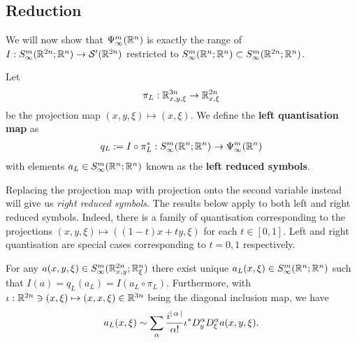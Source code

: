 \documentclass[12pt]{article}
\begin{document}
\subsection{Reduction}
We will now show that $\Psi^{m}_\infty({\mathbb R}^n)$ is exactly the range of $I : S^{m}_\infty({\mathbb R}^{2n}; {\mathbb R}^n) \to \mathcal{S}'({\mathbb R}^{2n})$ restricted to $S^{m}_\infty({\mathbb R}^{n}; {\mathbb R}^n) \subset S^{m}_\infty({\mathbb R}^{2n}; {\mathbb R}^n)$. 
\begin{fdefinition}
    Let 
    \begin{align*}
        \pi_L : {\mathbb R}^{3n}_{x, y, \xi} \to {\ensuremath {\mathbb R}}^{2n}_{x, \xi}
    \end{align*}
    be the projection map $(x, y, \xi) \mapsto (x, \xi)$. We define the \textbf{left quantisation map} as 
    \begin{align*}
        q_L := I \circ \pi_L^* : S^{m}_\infty({\mathbb R}^{n}; {\mathbb R}^n) \to \Psi^{m}_\infty({\mathbb R}^{n}) 
    \end{align*}
    with elements $a_L \in S^{m}_\infty({\mathbb R}^{n}; {\mathbb R}^n)$ known as the \textbf{left reduced symbols}.\\
   
\end{fdefinition}
\begin{rem}
        Replacing the projection map with projection onto the second variable instead will give us \textit{right reduced symbols}. The results below apply to both left and right reduced symbols. Indeed, there is a family of quantisation corresponding to the projections $(x, y, \xi) \mapsto ((1 - t)x + ty, \xi)$ for each $t \in [0, 1]$. Left and right quantisation are special cases corresponding to $t = 0, 1$ respectively. 
\end{rem}
\begin{flemma}[Reduction] 
    For any $a(x, y, \xi) \in S^{m}_\infty({\mathbb R}^{2n}_{x, y}; {\mathbb R}^n_\xi)$ there exist unique $a_L(x, \xi) \in S^{m}_\infty({\mathbb R}^{n}; {\mathbb R}^n)$ such that $I(a) = q_L(a_L) = I(a_L \circ \pi_L)$. Furthermore, with $\iota : {\mathbb R}^{2n} \ni (x, \xi) \mapsto (x, x, \xi) \in {\ensuremath {\mathbb R}}^{3n}$ being the diagonal inclusion map, we have 
    \begin{align}
        a_L(x, \xi) \sim \sum_{\alpha} \frac{i^{\left|\, \alpha\,\right|}}{\alpha !} \iota^* D^\alpha_y D^\alpha_\xi a(x, y, \xi). 
    \end{align}
\end{flemma}
\end{document}

